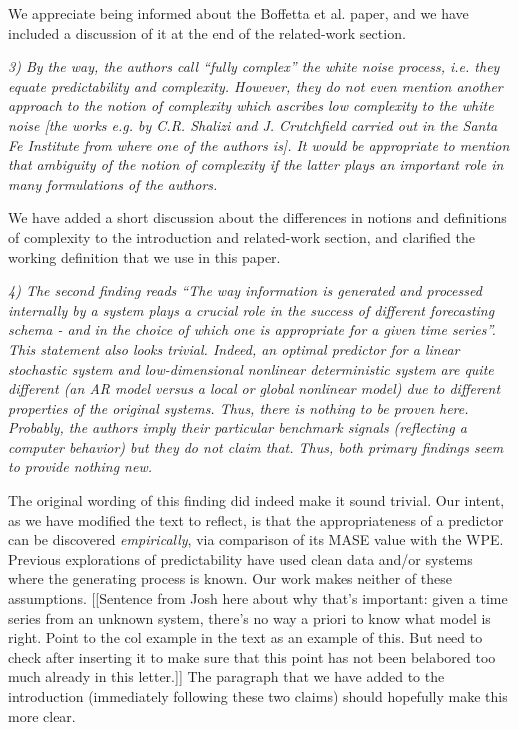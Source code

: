 \documentclass[12pt]{article}
\newcommand{\alert}[1]{{\color{red}#1}}
\begin{document}
We appreciate being informed about the Boffetta et al.  paper, and we
have included a discussion of it at the end of the related-work
section.

\smallskip

\emph{3) By the way, the authors call ``fully complex'' the white
  noise process, i.e. they equate predictability and
  complexity. However, they do not even mention another approach to
  the notion of complexity which ascribes low complexity to the white
  noise [the works e.g. by C.R. Shalizi and J. Crutchfield carried out
    in the Santa Fe Institute from where one of the authors is]. It
  would be appropriate to mention that ambiguity of the notion of
  complexity if the latter plays an important role in many
  formulations of the authors.}

We have added a short discussion about the differences in notions and
definitions of complexity to the introduction and related-work
section, and clarified the working definition that we use in this
paper.

\smallskip

\emph{4) The second finding reads ``The way information is generated
  and processed internally by a system plays a crucial role in the
  success of different forecasting schema - and in the choice of which
  one is appropriate for a given time series''. This statement also
  looks trivial. Indeed, an optimal predictor for a linear stochastic
  system and low-dimensional nonlinear deterministic system are quite
  different (an AR model versus a local or global nonlinear model) due
  to different properties of the original systems. Thus, there is
  nothing to be proven here. Probably, the authors imply their
  particular benchmark signals (reflecting a computer behavior) but
  they do not claim that.  Thus, both primary findings seem to provide
  nothing new.}

The original wording of this finding did indeed make it sound trivial.
Our intent, as we have modified the text to reflect, is that the
appropriateness of a predictor can be discovered \emph{empirically},
via comparison of its MASE value with the WPE.  Previous explorations
of predictability have used clean data and/or systems where the
generating process is known.  Our work makes neither of these
assumptions.  \alert{[[Sentence from Josh here about why that's
      important: given a time series from an unknown system, there's
      no way a priori to know what model is right.  Point to the col
      example in the text as an example of this.  But need to check
      after inserting it to make sure that this point has not been
      belabored too much already in this letter.]]}  The paragraph
that we have added to the introduction (immediately following these
two claims) should hopefully make this more clear.
\end{document}
